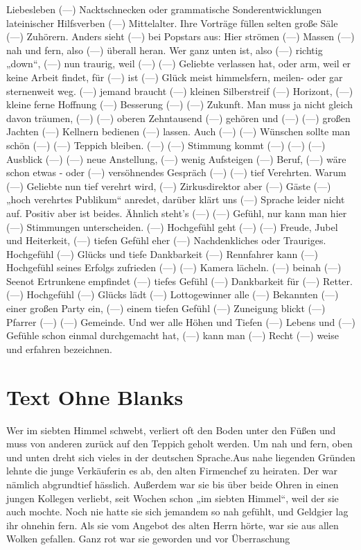 \documentclass[14pt,a4paper]{extarticle}
\begin{document}
Liebesleben (---) Nacktschnecken oder grammatische Sonderentwicklungen lateinischer Hilfsverben (---) Mittelalter. Ihre Vorträge füllen selten große Säle (---) Zuhörern. Anders sieht (---) bei Popstars aus: Hier strömen (---) Massen (---) nah und fern, also (---) überall heran.  Wer ganz unten ist, also (---) richtig „down“, (---) nun traurig, weil (---) (---) Geliebte verlassen hat, oder arm, weil er keine Arbeit findet, für (---) ist (---) Glück meist himmelsfern, meilen- oder gar sternenweit weg. (---) jemand braucht (---) kleinen Silberstreif (---) Horizont, (---) kleine ferne Hoffnung (---) Besserung (---) (---) Zukunft. Man muss ja nicht gleich davon träumen, (---) (---) oberen Zehntausend (---) gehören und (---) (---) großen Jachten (---) Kellnern bedienen (---) lassen. Auch (---) (---) Wünschen sollte man schön (---) (---) Teppich bleiben.  (---) (---) Stimmung kommt (---) (---)  (---) Ausblick (---) (---) neue Anstellung, (---) wenig Aufsteigen (---) Beruf, (---) wäre schon etwas - oder (---) versöhnendes Gespräch (---) (---) tief Verehrten. Warum (---) Geliebte nun tief verehrt wird, (---) Zirkusdirektor aber (---) Gäste (---) „hoch verehrtes Publikum“ anredet, darüber klärt uns (---) Sprache leider nicht auf. Positiv aber ist beides.  Ähnlich steht’s (---) (---) Gefühl, nur kann man hier (---) Stimmungen unterscheiden. (---) Hochgefühl geht (---) (---) Freude, Jubel und Heiterkeit, (---) tiefen Gefühl eher (---) Nachdenkliches oder Trauriges.  Hochgefühl (---) Glücks und tiefe Dankbarkeit  (---) Rennfahrer kann (---) Hochgefühl seines Erfolgs zufrieden (---) (---) Kamera lächeln. (---) beinah (---) Seenot Ertrunkene empfindet (---) tiefes Gefühl (---) Dankbarkeit für (---) Retter. (---) Hochgefühl (---) Glücks lädt (---) Lottogewinner alle (---) Bekannten (---) einer großen Party ein, (---) einem tiefen Gefühl (---) Zuneigung blickt (---) Pfarrer (---) (---) Gemeinde. Und wer alle Höhen und Tiefen (---) Lebens und (---) Gefühle schon einmal durchgemacht hat, (---) kann man (---) Recht (---) weise und erfahren bezeichnen.\newline\newline \newline\newline \section{Text Ohne Blanks}Wer im siebten Himmel schwebt, verliert oft den Boden unter den Füßen und muss von anderen zurück auf den Teppich geholt werden. Um nah und fern, oben und unten dreht sich vieles in der deutschen Sprache.\newline\newline \newline\newline Aus nahe liegenden Gründen lehnte die junge Verkäuferin es ab, den alten Firmenchef zu heiraten. Der war nämlich abgrundtief hässlich. Außerdem war sie bis über beide Ohren in einen jungen Kollegen verliebt, seit Wochen schon „im siebten Himmel“, weil der sie auch mochte. Noch nie hatte sie sich jemandem so nah gefühlt, und Geldgier lag ihr ohnehin fern. Als sie vom Angebot des alten Herrn hörte, war sie aus allen Wolken gefallen. Ganz rot war sie geworden und vor Überraschung 
\end{document}
